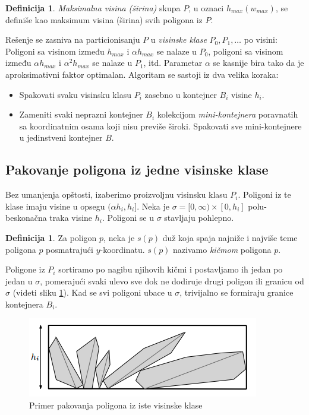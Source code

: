 \documentclass[a4paper]{article}
\theoremstyle{plain}
\theoremstyle{definition}
\newtheorem{defn}[thm]{Definicija} %
\begin{document}
\begin{defn}
    \emph{Maksimalna visina (\v{s}irina)} skupa $P$, u oznaci \emph{$h_{max} (w_{max})$}, se defini\v{s}e kao maksimum visina (\v{s}irina) svih poligona iz $P$.
\end{defn}

Re\v{s}enje se zasniva na particionisanju $P$ u \emph{visinske klase} $P_{0}, P_{1}, \dots$ po visini: Poligoni sa visinom između $h_{max}$ i $\alpha h_{max}$ se nalaze u $P_{0}$, poligoni sa visinom između $\alpha h_{max}$ i $\alpha^{2} h_{max}$ se nalaze u $P_{1}$, itd. Parametar $\alpha$ se kasnije bira tako da je aproksimativni faktor optimalan. Algoritam se sastoji iz dva velika koraka:
\begin{itemize}
    \item Spakovati svaku visinsku klasu $P_{i}$ zasebno u kontejner $B_{i}$ visine $h_{i}$.
    \item Zameniti svaki neprazni kontejner $B_{i}$ kolekcijom \emph{mini-kontejnera} poravnatih sa koordinatnim osama koji nisu previ\v{s}e \v{s}iroki. Spakovati sve mini-kontejnere u jedinstveni kontejner $B$.
\end{itemize}


\subsection{Pakovanje poligona iz jedne visinske klase}
\label{subsec:Korak1}

Bez umanjenja op\v{s}tosti, izaberimo proizvoljnu visinsku klasu $P_{i}$. Poligoni iz te klase imaju visine u opsegu $(\alpha h_{i}, h_{i}]$. Neka je $\sigma = [0, \infty) \times [0, h_{i}]$ polu-beskona\v{c}na traka visine $h_{i}$. Poligoni se u $\sigma$ stavljaju pohlepno.

\begin{defn}
    Za poligon $p$, neka je $s(p)$ du\v{z} koja spaja najni\v{z}e i najvi\v{s}e teme poligona $p$ posmatraju\'c{}i $y$-koordinatu. $s(p)$ nazivamo \emph{ki\v{c}mom} poligona $p$.
\end{defn}

Poligone iz $P_{i}$ sortiramo po nagibu njihovih ki\v{c}mi i postavljamo ih jedan po jedan u $\sigma$, pomeraju\'c{}i svaki ulevo sve dok ne dodiruje drugi poligon ili granicu od $\sigma$ (videti sliku \ref{fig1}). Kad se svi poligoni ubace u $\sigma$, trivijalno se formiraju granice kontejnera $B_{i}$.

\begin{figure}[H]
    \centering
    \includegraphics[scale=0.6]{resources/fig1.PNG}
    \caption{Primer pakovanja poligona iz iste visinske klase}
    \label{fig1}
\end{figure}
\end{document}
